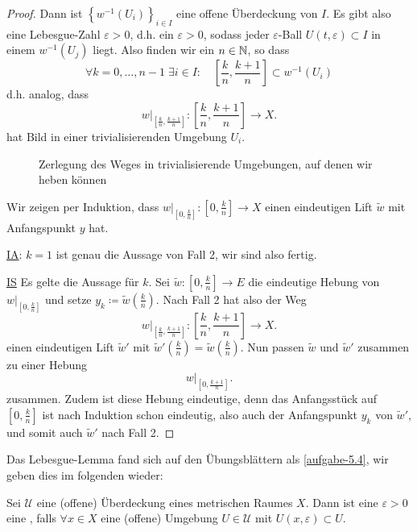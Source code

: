 \begin{proof}
    Dann ist $\left \{w^{-1}(U_i)\right\}_{i \in I} $ eine offene Überdeckung von $I$. Es gibt also eine Lebesgue-Zahl  $ε>0$, d.h. ein  $ε>0$, sodass jeder  $ε$-Ball  $U(t,ε)\subset I$ in einem $w^{-1}(U_j)$ liegt. Also finden wir ein $n\in \mathbb{N}$, so dass 
    \[
      \forall k=0,\ldots,n-1 \; \exists i\in I \colon  \quad  \left[ \frac{k}{n}, \frac{k+1}{n} \right] \subset w^{-1}(U_i)
    \]
    d.h. analog, dass
    \[
    w|_{\left[ \frac{k}{n}, \frac{k+1}{n} \right] } \colon  \left[ \frac{k}{n}, \frac{k+1}{n} \right] \to  X
    .\] 
    hat Bild in einer trivialisierenden Umgebung $U_i$.

\begin{figure}[ht]
    \centering
    \caption{Zerlegung des Weges in trivialisierende Umgebungen, auf denen wir heben können}
    \label{fig:hebung-auf-einzelnen-offenen-mengen}
\end{figure}

    Wir zeigen per Induktion, dass $w|_{\left[ 0,\frac{k}{n} \right] }\colon  \left[ 0, \frac{k}{n} \right]  \to  X$ einen eindeutigen Lift $\tilde{w}$ mit Anfangspunkt $y$ hat.

     \underline{IA}: $k=1$ ist genau die Aussage von Fall 2, wir sind also fertig. 

     \underline{IS} Es gelte die Aussage für $k$. Sei  $\tilde{w}\colon  \left[0,\frac{k}{n}\right]\to  E$ die eindeutige Hebung von $w|_{\left[0,\frac{k}{n}\right]}$ und setze $y_k \coloneqq  \tilde{w}\left( \frac{k}{n} \right) $. Nach Fall 2 hat also der Weg
     \[
     w|_{\left[ \frac{k}{n}, \frac{k+1}{n} \right] }\colon  \left[ \frac{k}{n}, \frac{k+1}{n} \right] \to  X
     .\] 
     einen eindeutigen Lift $\tilde{w}'$ mit $\tilde{w}'\left( \frac{k}{n} \right) = \tilde{w}\left(\frac{k}{n}\right)$. Nun passen $\tilde{w}$ und $\tilde{w}'$ zusammen zu einer Hebung 
     \[
     w|_{\left[ 0, \frac{k+1}{n} \right] }
     .\] 
     zusammen. Zudem ist diese Hebung eindeutige, denn das Anfangsstück auf $\left[0, \frac{k}{n}\right]$ ist nach Induktion schon eindeutig, also auch der Anfangspunkt  $y_k$ von  $\tilde{w}'$, und somit auch $\tilde{w}'$ nach Fall 2.
\end{proof}

\begin{remark*}
    Das Lebesgue-Lemma fand sich auf den Übungsblättern als \autoref{aufgabe-5.4}, wir geben dies im folgenden wieder:
\end{remark*}

\begin{definition*}[Lebesguezahl]\label{def:lebesguezahl}
    Sei $\mathcal{U}$ eine (offene) Überdeckung eines metrischen Raumes $X$. Dann ist eine  $ε>0$ eine  , falls $\forall x\in X$ eine (offene) Umgebung $U\in \mathcal{U}$ mit $U(x,ε) \subset U$.
\end{definition*}

